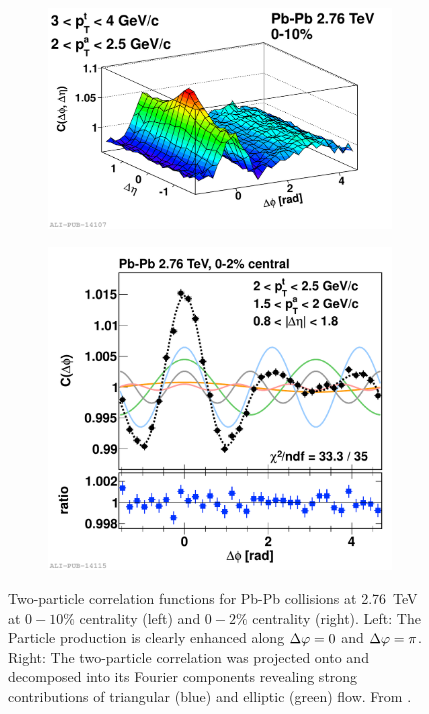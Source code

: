 \begin{figure}
  \centering
  \begin{subfigure}[m]{0.5\textwidth}
    \includegraphics[width=\textwidth]{figures/flow_PbPb_2d.pdf}
  \end{subfigure}%
  \begin{subfigure}[m]{0.5\textwidth}
    \includegraphics[width=\textwidth]{figures/flow_PbPb_decomp.pdf}
  \end{subfigure}
  \caption[Two-particle correlation functions for Pb-Pb collisions at \SI{2.76}{TeV} at $0-10\%$ centrality and $0-2\%$ centrality.]{Two-particle correlation functions for Pb-Pb collisions at \SI{2.76}{TeV} at $0-10\%$ centrality (left) and $0-2\%$ centrality (right). Left: The Particle production is clearly enhanced along $\Delta\varphi = 0$ and $\Delta\varphi = \pi$. Right: The two-particle correlation was projected onto \dphi and decomposed into its Fourier components revealing strong contributions of triangular (blue) and elliptic (green) flow. From \cite{Adare2012_2d,Adare2012}.}
  \label{fig:PbPb_2d_flow}
\end{figure}

